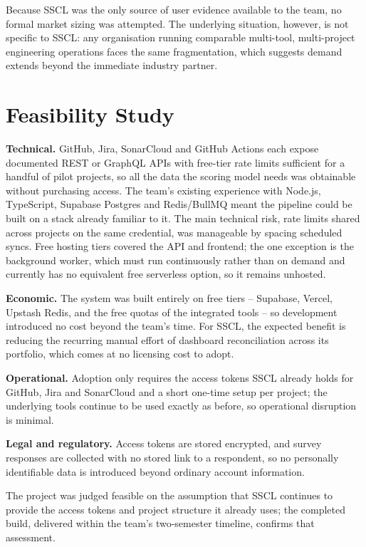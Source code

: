 Because SSCL was the only source of user evidence available to the team, no
formal market sizing was attempted. The underlying situation, however, is not
specific to SSCL: any organisation running comparable multi-tool,
multi-project engineering operations faces the same fragmentation, which
suggests demand extends beyond the immediate industry partner.

\section{Feasibility Study}
\label{sec:feasibility}
\textbf{Technical.} GitHub, Jira, SonarCloud and GitHub Actions each expose
documented REST or GraphQL APIs with free-tier rate limits sufficient for a
handful of pilot projects, so all the data the scoring model needs was
obtainable without purchasing access. The team's existing experience with
Node.js, TypeScript, Supabase Postgres and Redis/BullMQ meant the pipeline
could be built on a stack already familiar to it. The main technical risk,
rate limits shared across projects on the same credential, was manageable by
spacing scheduled syncs. Free hosting tiers covered the API and frontend; the
one exception is the background worker, which must run continuously rather
than on demand and currently has no equivalent free serverless option, so it
remains unhosted.

\textbf{Economic.} The system was built entirely on free tiers -- Supabase,
Vercel, Upstash Redis, and the free quotas of the integrated tools -- so
development introduced no cost beyond the team's time. For SSCL, the
expected benefit is reducing the recurring manual effort of dashboard
reconciliation across its portfolio, which comes at no licensing cost to
adopt.

\textbf{Operational.} Adoption only requires the access tokens SSCL already
holds for GitHub, Jira and SonarCloud and a short one-time setup per
project; the underlying tools continue to be used exactly as before, so
operational disruption is minimal.

\textbf{Legal and regulatory.} Access tokens are stored encrypted, and
survey responses are collected with no stored link to a respondent, so no
personally identifiable data is introduced beyond ordinary account
information.

The project was judged feasible on the assumption that SSCL continues to
provide the access tokens and project structure it already uses; the
completed build, delivered within the team's two-semester timeline, confirms
that assessment.
